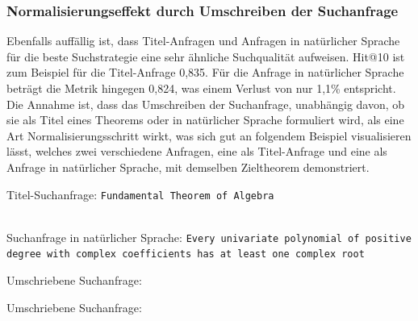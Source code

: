 \documentclass[12pt,letterpaper]{article} %
\begin{document}
\subsubsection{Normalisierungseffekt durch Umschreiben der Suchanfrage}

Ebenfalls auffällig ist, dass Titel-Anfragen und Anfragen in natürlicher Sprache für die beste Suchstrategie eine sehr ähnliche Suchqualität aufweisen.
Hit@10 ist zum Beispiel für die Titel-Anfrage 0,835. Für die Anfrage in natürlicher Sprache beträgt die Metrik hingegen 0,824, was einem Verlust von nur 1,1\% entspricht.
Die Annahme ist, dass das Umschreiben der Suchanfrage, unabhängig davon, ob sie als Titel eines Theorems oder in natürlicher Sprache formuliert wird, als eine Art Normalisierungsschritt wirkt, was sich gut an folgendem Beispiel visualisieren lässt, welches zwei verschiedene Anfragen, eine als Titel-Anfrage und eine als Anfrage in natürlicher Sprache, mit demselben Zieltheorem demonstriert.

\centering
\begin{minipage}[t]{0.495\textwidth}
    \scriptsize
    \begin{mybox}{Titel-Suchanfrage:}
    \texttt{Fundamental Theorem of Algebra \\ \\}
    \end{mybox}
\end{minipage}
\begin{minipage}[t]{0.495\textwidth}
    \scriptsize
    \begin{mybox}{Suchanfrage in natürlicher Sprache:}
    \texttt{Every univariate polynomial of positive degree with complex coefficients has at least one complex root}
    \end{mybox}
\end{minipage}
\begin{minipage}[t]{0.495\textwidth}
    \scriptsize
    \begin{mybox}{Umschriebene Suchanfrage:}
    \texttt{}
    \end{mybox}
\end{minipage}
\begin{minipage}[t]{0.495\textwidth}
    \scriptsize
    \begin{mybox}{Umschriebene Suchanfrage:}
    \texttt{}
    \end{mybox}
\end{minipage}
\vspace{1em}
\justifying
\end{document}
